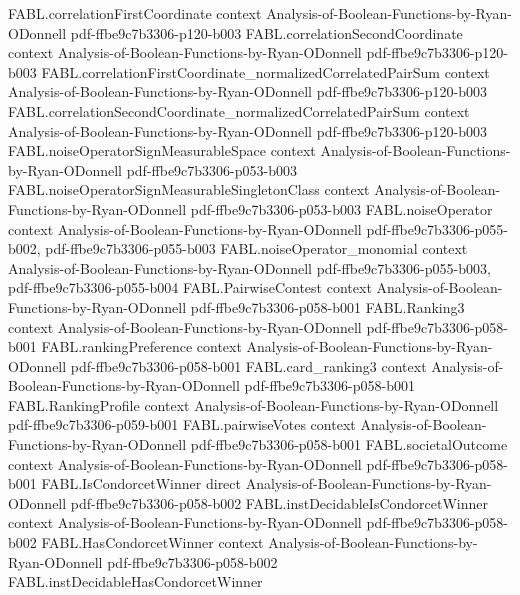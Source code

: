 \begin{theorem}
\proofstep
  {FABL.correlationFirstCoordinate}
  {context}
  {Analysis-of-Boolean-Functions-by-Ryan-ODonnell}
  {pdf-ffbe9c7b3306-p120-b003}
\proofstep
  {FABL.correlationSecondCoordinate}
  {context}
  {Analysis-of-Boolean-Functions-by-Ryan-ODonnell}
  {pdf-ffbe9c7b3306-p120-b003}
\proofstep
  {FABL.correlationFirstCoordinate_normalizedCorrelatedPairSum}
  {context}
  {Analysis-of-Boolean-Functions-by-Ryan-ODonnell}
  {pdf-ffbe9c7b3306-p120-b003}
\proofstep
  {FABL.correlationSecondCoordinate_normalizedCorrelatedPairSum}
  {context}
  {Analysis-of-Boolean-Functions-by-Ryan-ODonnell}
  {pdf-ffbe9c7b3306-p120-b003}
\proofstep
  {FABL.noiseOperatorSignMeasurableSpace}
  {context}
  {Analysis-of-Boolean-Functions-by-Ryan-ODonnell}
  {pdf-ffbe9c7b3306-p053-b003}
\proofstep
  {FABL.noiseOperatorSignMeasurableSingletonClass}
  {context}
  {Analysis-of-Boolean-Functions-by-Ryan-ODonnell}
  {pdf-ffbe9c7b3306-p053-b003}
\proofstep
  {FABL.noiseOperator}
  {context}
  {Analysis-of-Boolean-Functions-by-Ryan-ODonnell}
  {pdf-ffbe9c7b3306-p055-b002,
    pdf-ffbe9c7b3306-p055-b003}
\proofstep
  {FABL.noiseOperator_monomial}
  {context}
  {Analysis-of-Boolean-Functions-by-Ryan-ODonnell}
  {pdf-ffbe9c7b3306-p055-b003,
    pdf-ffbe9c7b3306-p055-b004}
\proofstep
  {FABL.PairwiseContest}
  {context}
  {Analysis-of-Boolean-Functions-by-Ryan-ODonnell}
  {pdf-ffbe9c7b3306-p058-b001}
\proofstep
  {FABL.Ranking3}
  {context}
  {Analysis-of-Boolean-Functions-by-Ryan-ODonnell}
  {pdf-ffbe9c7b3306-p058-b001}
\proofstep
  {FABL.rankingPreference}
  {context}
  {Analysis-of-Boolean-Functions-by-Ryan-ODonnell}
  {pdf-ffbe9c7b3306-p058-b001}
\proofstep
  {FABL.card_ranking3}
  {context}
  {Analysis-of-Boolean-Functions-by-Ryan-ODonnell}
  {pdf-ffbe9c7b3306-p058-b001}
\proofstep
  {FABL.RankingProfile}
  {context}
  {Analysis-of-Boolean-Functions-by-Ryan-ODonnell}
  {pdf-ffbe9c7b3306-p059-b001}
\proofstep
  {FABL.pairwiseVotes}
  {context}
  {Analysis-of-Boolean-Functions-by-Ryan-ODonnell}
  {pdf-ffbe9c7b3306-p058-b001}
\proofstep
  {FABL.societalOutcome}
  {context}
  {Analysis-of-Boolean-Functions-by-Ryan-ODonnell}
  {pdf-ffbe9c7b3306-p058-b001}
\proofstep
  {FABL.IsCondorcetWinner}
  {direct}
  {Analysis-of-Boolean-Functions-by-Ryan-ODonnell}
  {pdf-ffbe9c7b3306-p058-b002}
\proofstep
  {FABL.instDecidableIsCondorcetWinner}
  {context}
  {Analysis-of-Boolean-Functions-by-Ryan-ODonnell}
  {pdf-ffbe9c7b3306-p058-b002}
\proofstep
  {FABL.HasCondorcetWinner}
  {context}
  {Analysis-of-Boolean-Functions-by-Ryan-ODonnell}
  {pdf-ffbe9c7b3306-p058-b002}
\proofstep
  {FABL.instDecidableHasCondorcetWinner}

\end{theorem}
